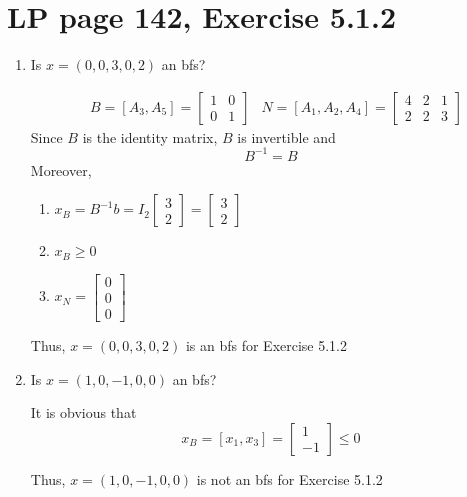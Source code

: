 \documentclass[11pt]{article}
\begin{document}
\section{LP page 142, Exercise 5.1.2}

\begin{enumerate}
    \item Is $x=(0, 0, 3, 0, 2)$ an bfs? \par
    
    \begin{align*}
            & B = [A_3, A_5] = \begin{bmatrix}1 & 0 \\ 0 & 1\end{bmatrix} & N = [A_1, A_2, A_4] = \begin{bmatrix} 4 & 2 & 1 \\ 2 & 2 & 3 \end{bmatrix}
    \end{align*}
    Since $B$ is the identity matrix, $B$ is invertible and $$B^{-1} = B$$
    Moreover, 
    \begin{enumerate}
        \raggedright 
        \item $ x_B = B^{-1}b = I_2 \begin{bmatrix} 3 \\  2\end{bmatrix} = \begin{bmatrix} 3 \\ 2\end{bmatrix}$
        \item $x_B \geq 0$
        \item $x_N = \begin{bmatrix} 0 \\ 0 \\ 0 \end{bmatrix}$
    \end{enumerate}
    Thus, $x=(0, 0, 3, 0, 2)$ is an bfs for Exercise 5.1.2

    \item Is $x=(1, 0, -1, 0, 0)$ an bfs? \par
    It is obvious that $$x_B = [x_1, x_3] = \begin{bmatrix} 1 \\ -1\end{bmatrix} \leq 0$$
    
    Thus, $x=(1, 0, -1, 0, 0)$ is not an bfs for Exercise 5.1.2
    

\end{enumerate}
\end{document}
